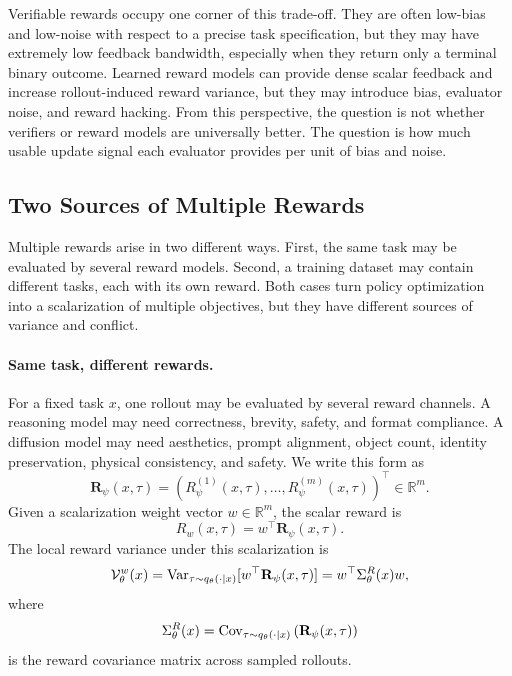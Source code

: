 \begin{discussionbox}[title={Discussion: Verifiers and learned reward models}]
Verifiable rewards occupy one corner of this trade-off. They are often low-bias and low-noise with respect to a precise task specification, but they may have extremely low feedback bandwidth, especially when they return only a terminal binary outcome. Learned reward models can provide dense scalar feedback and increase rollout-induced reward variance, but they may introduce bias, evaluator noise, and reward hacking. From this perspective, the question is not whether verifiers or reward models are universally better. The question is how much usable update signal each evaluator provides per unit of bias and noise.
\end{discussionbox}

\subsection{Two Sources of Multiple Rewards}

Multiple rewards arise in two different ways. First, the same task may be evaluated by several reward models. Second, a training dataset may contain different tasks, each with its own reward. Both cases turn policy optimization into a scalarization of multiple objectives, but they have different sources of variance and conflict.

\paragraph{Same task, different rewards.}
For a fixed task $x$, one rollout may be evaluated by several reward channels. A reasoning model may need correctness, brevity, safety, and format compliance. A diffusion model may need aesthetics, prompt alignment, object count, identity preservation, physical consistency, and safety. We write this form as
\[
  \mathbf{R}_\psi(x,\tau)
  =
  \left(
    R_\psi^{(1)}(x,\tau),\ldots,R_\psi^{(m)}(x,\tau)
  \right)^\top
  \in \mathbb{R}^m.
\]
Given a scalarization weight vector $w\in\mathbb{R}^m$, the scalar reward is
\[
  R_w(x,\tau)=w^\top \mathbf{R}_\psi(x,\tau).
\]
The local reward variance under this scalarization is
\[
  \mathcal{V}_\theta^w(x)
  =
  \mathrm{Var}_{\tau\sim q_\theta(\cdot\mid x)}
  [w^\top \mathbf{R}_\psi(x,\tau)]
  =
  w^\top
  \Sigma_\theta^R(x)
  w,
\]
where
\[
  \Sigma_\theta^R(x)
  =
  \mathrm{Cov}_{\tau\sim q_\theta(\cdot\mid x)}
  \left(
    \mathbf{R}_\psi(x,\tau)
  \right)
\]
is the reward covariance matrix across sampled rollouts.

